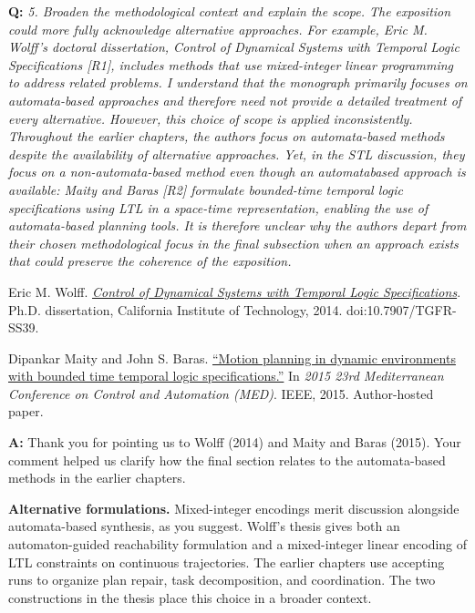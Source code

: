 \documentclass[11pt]{article}
\begin{document}
\begin{shaded*}
\noindent\textbf{Q:} \emph{5. Broaden the methodological context and
explain the scope. The exposition could more fully acknowledge alternative approaches. For
example, Eric M. Wolff's doctoral dissertation, Control of Dynamical Systems with Temporal
Logic Specifications [R1], includes methods that use mixed-integer linear programming to
address related problems. I understand that the monograph primarily focuses on
automata-based approaches and therefore need not provide a detailed treatment of every
alternative. However, this choice of scope is applied inconsistently. Throughout the
earlier chapters, the authors focus on automata-based methods despite the availability of
alternative approaches. Yet, in the STL discussion, they focus on a non-automata-based
method even though an automatabased approach is available: Maity and Baras [R2] formulate
bounded-time temporal logic specifications using LTL in a space-time representation,
enabling the use of automata-based planning tools. It is therefore unclear why the authors
depart from their chosen methodological focus in the final subsection when an approach
exists that could preserve the coherence of the exposition.}

\noindent [R1] Eric M. Wolff.
\href{https://thesis.caltech.edu/8078/}{\emph{Control of Dynamical Systems with
Temporal Logic Specifications}}. Ph.D. dissertation, California Institute of
Technology, 2014. doi:10.7907/TGFR-SS39.

\noindent [R2] Dipankar Maity and John S. Baras.
\href{https://johnbaras.com/wp-content/uploads/2020/10/15-08-MCC-2015-Final-Pub-Ver.pdf}%
{``Motion planning in dynamic environments with bounded time temporal logic
specifications.''} In
\emph{2015 23rd Mediterranean Conference on Control and Automation (MED)}.
IEEE, 2015. Author-hosted paper.
\end{shaded*}
\noindent\textbf{A:} Thank you for pointing us to Wolff (2014) and Maity and Baras
(2015). Your comment helped us clarify how the final section relates to the
automata-based methods in the earlier chapters.

\textbf{Alternative formulations.} Mixed-integer encodings merit discussion
alongside automata-based synthesis, as you suggest. Wolff's thesis gives both an
automaton-guided reachability formulation and a mixed-integer linear encoding
of LTL constraints on continuous trajectories. The earlier chapters use
accepting runs to organize plan repair, task decomposition, and coordination.
The two constructions in the thesis place this choice in a broader context.
\end{document}

